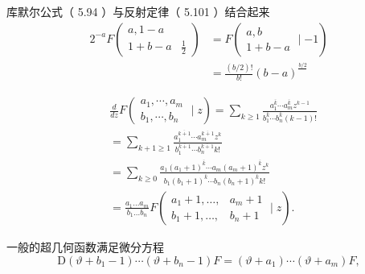 库默尔公式（ 5.94 ）与反射定律（ 5.101 ）结合起来
\begin{equation}
    \begin{aligned}
    2^{-a} F\left(\begin{array}{c|c}
    a, 1-a \\
    1+b-a & \frac{1}{2}
    \end{array}\right) &=F\left(\begin{array}{c}
    a, b \\
    1+b-a
    \end{array} \mid-1\right) \\
    &=\frac{(b / 2) !}{b !}(b-a)^{\frac{b / 2}{}}
    \end{aligned}
\end{equation}

\setcounter{equation}{105}
\begin{equation}
    \begin{aligned}
    &\frac{d}{d z} F\left(\begin{array}{l}
    a_{1}, \cdots, a_{m} \\
    b_{1}, \cdots, b_{n}
    \end{array} \mid z\right)=\sum_{k \geqslant 1} \frac{a_{1}^{\bar{k}} \cdots a_{m}^{\bar{k}} z^{k-1}}{b_{1}^{\bar{k}} \cdots b_{n}^{\bar{k}}(k-1) !}\\
    &=\sum_{k+1 \geqslant 1} \frac{a_{1}^{\overline{k+1}} \cdots a_{m}^{\overline{k+1}} z^{k}}{b_{1}^{\overline{k+1}} \cdots b_{n}^{\overline{k+1}} k !}\\
    &=\sum_{k \geqslant 0} \frac{a_{1}\left(a_{1}+1\right)^{\bar{k}} \cdots a_{m}\left(a_{m}+1\right)^{\bar{k}} z^{k}}{b_{1}\left(b_{1}+1\right)^{\bar{k}} \cdots b_{n}\left(b_{n}+1\right)^{\bar{k}} k !}\\
    &=\frac{a_{1} \ldots a_{m}}{b_{1} \ldots b_{n}} F\left(\begin{array}{ll}
    a_{1}+1, \ldots, & a_{m}+1 \\
    b_{1}+1, \ldots, & b_{n}+1
    \end{array} \mid z\right) \text {. }
    \end{aligned}
\end{equation}

一般的超几何函数满足微分方程
\begin{equation}
    \mathrm{D}\left(\vartheta+b_{1}-1\right) \cdots\left(\vartheta+b_{n}-1\right) F=\left(\vartheta+a_{1}\right) \cdots\left(\vartheta+a_{m}\right) F,
\end{equation}

